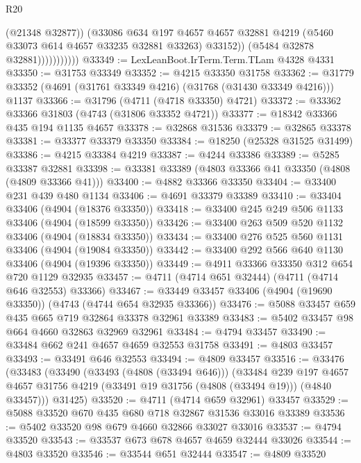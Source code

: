 \begin{lexlean}{R20}
\begin{coremodule}
                            (@21348 @32877))
                          (@33086
                            @634
                            @197
                            @4657
                            @4657
                            @32881
                            @4219
                            (@5460 @33073 @614 @4657 @33235 @32881 @33263)
                            @33152))
                        (@5484 @32878 @32881)))))))))))
@33349 := LexLeanBoot.IrTerm.Term.TLam @4328 @4331
@33350 := @31753 @33349
@33352 := @4215 @33350 @31758
@33362 := @31779 @33352 (@4691 (@31761 @33349 @4216) (@31768 (@31430 @33349 @4216))) @1137
@33366 := @31796 (@4711 (@4718 @33350) @4721)
@33372 := @33362 @33366 @31803 (@4743 (@31806 @33352 @4721))
@33377 := @18342 @33366 @435 @194 @1135 @4657
@33378 := @32868 @31536
@33379 := @32865 @33378
@33381 := @33377 @33379 @33350
@33384 := @18250 (@25328 @31525 @31499)
@33386 := @4215 @33384 @4219
@33387 := @4244 @33386
@33389 := @5285 @33387 @32881
@33398 := @33381 @33389 (@4803 @33366 @41 @33350 (@4808 (@4809 @33366 @41)))
@33400 := @4882 @33366 @33350
@33404 := @33400 @231 @439 @480 @1134
@33406 := @4691 @33379 @33389
@33410 := @33404 @33406 (@4904 (@18376 @33350))
@33418 := @33400 @245 @249 @506 @1133 @33406 (@4904 (@18599 @33350))
@33426 := @33400 @263 @509 @520 @1132 @33406 (@4904 (@18834 @33350))
@33434 := @33400 @276 @525 @560 @1131 @33406 (@4904 (@19084 @33350))
@33442 := @33400 @292 @566 @640 @1130 @33406 (@4904 (@19396 @33350))
@33449 := @4911 @33366 @33350 @312 @654 @720 @1129 @32935
@33457 := @4711 (@4714 @651 @32444) (@4711 (@4714 @646 @32553) @33366)
@33467 := @33449 @33457 @33406 (@4904 (@19690 @33350)) (@4743 (@4744 @654 @32935 @33366))
@33476 := @5088 @33457 @659 @435 @665 @719 @32864 @33378 @32961 @33389
@33483 := @5402 @33457 @98 @664 @4660 @32863 @32969 @32961
@33484 := @4794 @33457
@33490 := @33484 @662 @241 @4657 @4659 @32553 @31758
@33491 := @4803 @33457
@33493 := @33491 @646 @32553
@33494 := @4809 @33457
@33516 := @33476
    (@33483
      (@33490
        (@33493 (@4808 (@33494 @646)))
        (@33484
          @239
          @197
          @4657
          @4657
          @31756
          @4219
          (@33491 @19 @31756 (@4808 (@33494 @19)))
          (@4840 @33457)))
      @31425)
@33520 := @4711 (@4714 @659 @32961) @33457
@33529 := @5088 @33520 @670 @435 @680 @718 @32867 @31536 @33016 @33389
@33536 := @5402 @33520 @98 @679 @4660 @32866 @33027 @33016
@33537 := @4794 @33520
@33543 := @33537 @673 @678 @4657 @4659 @32444 @33026
@33544 := @4803 @33520
@33546 := @33544 @651 @32444
@33547 := @4809 @33520

\end{coremodule}
\end{lexlean}
